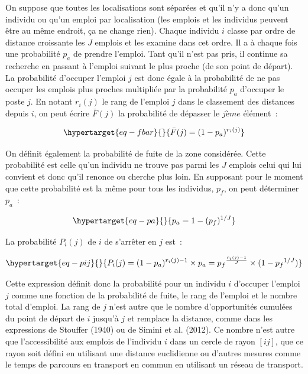\documentclass[
  10pt,
  a4paper,
  numbers=noendperiod,
  DIV=9]{scrreprt}
\begin{document}
On suppose que toutes les localisations sont séparées et qu'il n'y a
donc qu'un individu ou qu'un emploi par localisation (les emplois et les
individus peuvent être au même endroit, ça ne change rien). Chaque
individu \(i\) classe par ordre de distance croissante les \(J\) emplois
et les examine dans cet ordre. Il a à chaque fois une probabilité
\(p_a\) de prendre l'emploi. Tant qu'il n'est pas pris, il continue sa
recherche en passant à l'emploi suivant le plus proche (de son point de
départ). La probabilité d'occuper l'emploi \(j\) est donc égale à la
probabilité de ne pas occuper les emplois plus proches multipliée par la
probabilité \(p_a\) d'occuper le poste \(j\). En notant \(r_{i}(j)\) le
rang de l'emploi \(j\) dans le classement des distances depuis \(i\), on
peut écrire \(\bar F(j)\) la probabilité de dépasser le \(jème\)
élément~:

\begin{equation}\protect\hypertarget{eq-fbar}{}{
\bar F(j)=(1-p_a)^{r_i(j)}
}\label{eq-fbar}\end{equation}

On définit également la probabilité de fuite de la zone considérée.
Cette probabilité est celle qu'un individu ne trouve pas parmi les \(J\)
emplois celui qui lui convient et donc qu'il renonce ou cherche plus
loin. En supposant pour le moment que cette probabilité est la même pour
tous les individus, \(p_f\), on peut déterminer \(p_a\)~:

\begin{equation}\protect\hypertarget{eq-pa}{}{
p_a = 1-(p_f)^{1/J}
}\label{eq-pa}\end{equation}

La probabilité \(P_i(j)\) de \(i\) de s'arrêter en \(j\) est~:

\begin{equation}\protect\hypertarget{eq-pij}{}{
P_i(j) = (1-p_a)^{r_i(j)-1} \times p_a = {p_f}^{\frac {r_i(j)-1} {J}} \times (1-{p_f}^{1/J})
}\label{eq-pij}\end{equation}

Cette expression définit donc la probabilité pour un individu \(i\)
d'occuper l'emploi \(j\) comme une fonction de la probabilité de fuite,
le rang de l'emploi et le nombre total d'emploi. La rang de \(j\) n'est
autre que le nombre d'opportunités cumulées du point de départ de \(i\)
jusqu'à \(j\) et remplace la distance, comme dans les expressions de
Stouffer (1940) ou de Simini et al. (2012). Ce nombre n'est autre que
l'accessibilité aux emplois de l'individu \(i\) dans un cercle de rayon
\([ij]\), que ce rayon soit défini en utilisant une distance euclidienne
ou d'autres mesures comme le temps de parcours en transport en commun en
utilisant un réseau de transport.
\end{document}
